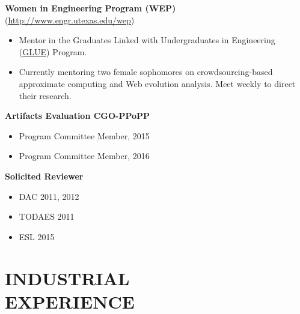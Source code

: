 \documentclass[margin, 9pt]{res} %
\begin{document}
\begin{resume}
\medskip
\textbf{Women in Engineering Program (WEP)} (\url{http://www.engr.utexas.edu/wep})\\
\vspace*{-10pt}
\begin{itemize}[leftmargin=*] \itemsep -3pt
\vspace*{-5pt}
	\item Mentor in the Graduates Linked with Undergraduates in Engineering (\href{http://www.engr.utexas.edu/wep/career/glue}{GLUE}) Program. \par
        \item Currently mentoring two female sophomores on crowdsourcing-based approximate computing and Web evolution analysis. Meet weekly to direct their research.
\end{itemize}

\medskip
\textbf{Artifacts Evaluation CGO-PPoPP}\\
\vspace*{-10pt}
\begin{itemize}[leftmargin=*] \itemsep -3pt
\vspace*{-5pt}
	\item Program Committee Member, 2015\par
	\item Program Committee Member, 2016\par
\end{itemize}

\medskip
\textbf{Solicited Reviewer}\\
\vspace*{-10pt}
\begin{itemize}[leftmargin=*] \itemsep -3pt
\vspace*{-5pt}
	\item DAC 2011, 2012\par
	\item TODAES 2011\par
    \item ESL 2015\par
\end{itemize}


\section{INDUSTRIAL\\ EXPERIENCE} 


\end{resume}
\end{document}
